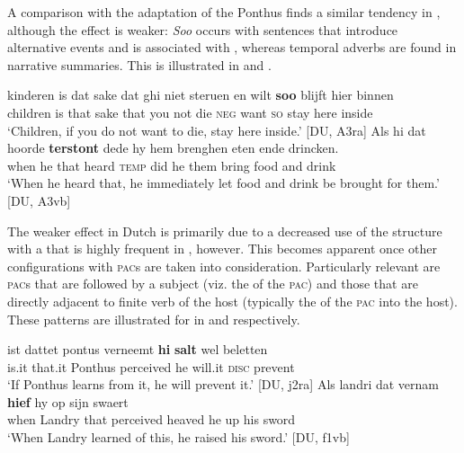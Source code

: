 \documentclass[output=paper,colorlinks,citecolor=brown]{langscibook}
\begin{document}
A comparison with the  adaptation of the Ponthus finds a similar tendency in , although the effect is weaker: \textit{Soo} occurs with sentences that introduce alternative events and is associated with , whereas temporal adverbs are found in narrative summaries. This is illustrated in  and .

\ea
\ea \label{ex:bloom:3}
\gll kinderen is dat sake dat ghi niet steruen en wilt \textbf{soo} blijft hier binnen\\
children is that sake that you not die \textsc{neg} want \textsc{so} stay here inside\\ 
\glt `Children, if you do not want to die, stay here inside.' \hfill [DU, A3ra]
\ex \label{ex:bloom:4}
\gll Als hi dat hoorde \textbf{terstont} dede hy hem brenghen eten ende drincken.\\
when he that heard \textsc{temp} did he them bring food and drink\\
\glt `When he heard that, he immediately let food and drink be brought for them.' \hfill [DU, A3vb]
\z
\z

\noindent The weaker effect in Dutch is primarily due to a decreased use of the  structure with a  that is highly frequent in , however. This becomes apparent once other configurations with \textsc{pac}s are taken into consideration. Particularly relevant are \textsc{pac}s that are followed by a subject (viz. the  of the \textsc{pac}) and those that are directly adjacent to finite verb of the host (typically the  of the \textsc{pac} into the host). These patterns are illustrated for  in  and  respectively.

\ea
\ea \label{ex:DUjux}
\gll ist dattet pontus verneemt \textbf{hi} \textbf{salt} wel beletten \\
is.it that.it Ponthus perceived he will.it \textsc{disc} prevent\\
\glt `If Ponthus learns from it, he will prevent it.' \hfill [DU, j2ra]
\ex \label{ex:DUint}
\gll Als landri dat vernam \textbf{hief} hy op sijn swaert\\
when Landry that perceived heaved he up his sword\\
\glt `When Landry learned of this, he raised his sword.' \hfill [DU, f1vb]
\z
\z
\end{document}
